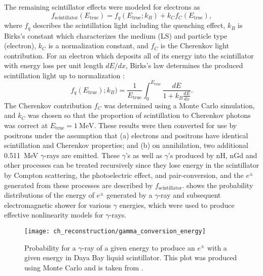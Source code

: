 The remaining scintillator effects were modeled for electrons as
\begin{equation}
    f_{\text{scintillator}}(E_{\text{true}}) =
    f_q(E_{\text{true}};k_B) + k_Cf_C(E_{\text{true}}),
\end{equation}
where $f_q$ describes the scintillation light including the quenching effect,
$k_B$ is Birks's constant which characterizes the medium (LS)
and particle type (electron),
$k_C$ is a normalization constant,
and $f_C$ is the Cherenkov light contribution.
For an electron which deposits all of its energy into the scintillator
with energy loss per unit length $dE/dx$,
Birks's law determines the produced scintillation light up to normalization \cite{birks}:
\begin{equation}
    f_q(E_{\text{true}});k_B) = \frac{1}{E_{\text{true}}} \int_0^{E_{\text{true}}}
    \frac{dE}{1+k_B\frac{dE}{dx}}.
\end{equation}
The Cherenkov contribution $f_C$ was determined using a Monte Carlo simulation,
and $k_C$ was chosen so that the proportion of scintillation to Cherenkov photons
was correct at $E_{\text{true}} = \SI{1}{\MeV}$.
These results were then converted for use by positrons under the assumption that
(a) electrons and positrons have identical scintillation and Cherenkov properties;
and (b) on annihilation, two additional \SI{0.511}{\MeV} $\gamma$-rays are emitted.
These $\gamma$'s as well as $\gamma$'s produced by nH, nGd and other processes
can be treated recursively
since they lose energy in the scintillator
by Compton scattering, the photoelectric effect, and pair-conversion,
and the $e^{\pm}$ generated from these processes
are described by $f_{\text{scintillator}}$.
 shows the probability distributions
of the energy of $e^{\pm}$ generated by a $\gamma$-ray
and subsequent electromagnetic shower for various $\gamma$ energies,
which were used to produce effective nonlinearity models for $\gamma$-rays.

\begin{figure}
    \centering
    \texttt{[image: ch\_reconstruction/gamma\_conversion\_energy]}
    \caption[$e^{\pm}$ spectrum from $\gamma$-rays]{
        Probability for a $\gamma$-ray of a given energy to produce
        an $e^{\pm}$ with a given energy in Daya Bay liquid scintillator.
        This plot was produced using Monte Carlo and is taken from \cite{nonlinearity1}.
    }
    \label{fig:gamma_conversion}
\end{figure}

